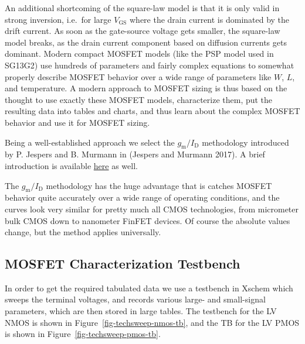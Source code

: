 \documentclass[
  a4paper,
  DIV=11,
  numbers=noendperiod]{scrartcl}
\begin{document}
An additional shortcoming of the square-law model is that it is only
valid in strong inversion, i.e.~for large \(V_\mathrm{GS}\) where the
drain current is dominated by the drift current. As soon as the
gate-source voltage gets smaller, the square-law model breaks, as the
drain current component based on diffusion currents gets dominant.
Modern compact MOSFET models (like the PSP model used in SG13G2) use
hundreds of parameters and fairly complex equations to somewhat properly
describe MOSFET behavior over a wide range of parameters like \(W\),
\(L\), and temperature. A modern approach to MOSFET sizing is thus based
on the thought to use exactly these MOSFET models, characterize them,
put the resulting data into tables and charts, and thus learn about the
complex MOSFET behavior and use it for MOSFET sizing.

Being a well-established approach we select the
\(g_\mathrm{m}/I_\mathrm{D}\) methodology introduced by P. Jespers and
B. Murmann in (Jespers and Murmann 2017). A brief introduction is
available
\href{https://github.com/iic-jku/analog-circuit-design/blob/main/sizing/Ref_Murmann_gmID.pdf}{here}
as well.

The \(g_\mathrm{m}/I_\mathrm{D}\) methodology has the huge advantage
that is catches MOSFET behavior quite accurately over a wide range of
operating conditions, and the curves look very similar for pretty much
all CMOS technologies, from micrometer bulk CMOS down to nanometer
FinFET devices. Of course the absolute values change, but the method
applies universally.

\subsection{MOSFET Characterization
Testbench}\label{mosfet-characterization-testbench}

In order to get the required tabulated data we use a testbench in Xschem
which sweeps the terminal voltages, and records various large- and
small-signal parameters, which are then stored in large tables. The
testbench for the LV NMOS is shown in
Figure~\ref{fig-techsweep-nmos-tb}, and the TB for the LV PMOS is shown
in Figure~\ref{fig-techsweep-pmos-tb}.
\end{document}
